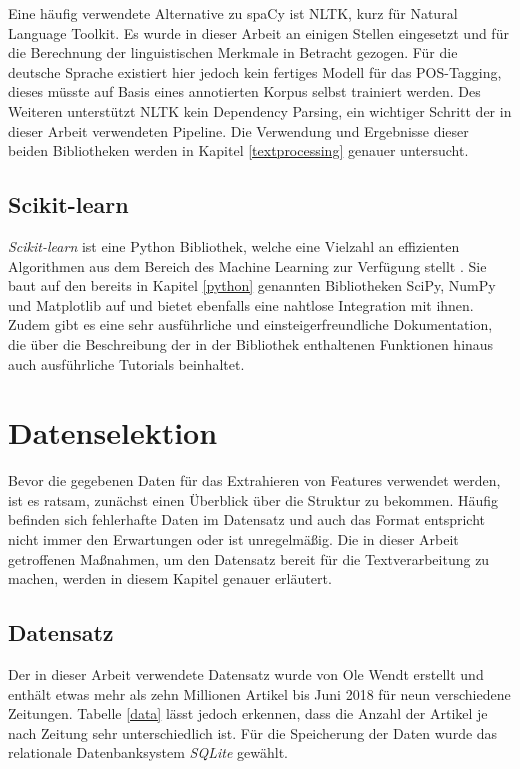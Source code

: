 Eine häufig verwendete Alternative zu spaCy ist NLTK, kurz für Natural Language Toolkit. Es wurde in dieser Arbeit an einigen Stellen eingesetzt und für die Berechnung der linguistischen Merkmale in Betracht gezogen. Für die deutsche Sprache existiert hier jedoch kein fertiges Modell für das POS-Tagging, dieses müsste auf Basis eines annotierten Korpus selbst trainiert werden. Des Weiteren unterstützt NLTK kein Dependency Parsing, ein wichtiger Schritt der in dieser Arbeit verwendeten Pipeline. Die Verwendung und Ergebnisse dieser beiden Bibliotheken werden in Kapitel \ref{textprocessing} genauer untersucht.

\subsection{Scikit-learn}
\emph{Scikit-learn} ist eine Python Bibliothek, welche eine Vielzahl an effizienten Algorithmen aus dem Bereich des Machine Learning zur Verfügung stellt \cite{scikit-learn}. Sie baut auf den bereits in Kapitel \ref{python} genannten Bibliotheken SciPy, NumPy und Matplotlib auf und bietet ebenfalls eine nahtlose Integration mit ihnen. Zudem gibt es eine sehr ausführliche und einsteigerfreundliche Dokumentation, die über die Beschreibung der in der Bibliothek enthaltenen Funktionen hinaus auch ausführliche Tutorials beinhaltet.

\section{Datenselektion}
Bevor die gegebenen Daten für das Extrahieren von Features verwendet werden, ist es ratsam, zunächst einen Überblick über die Struktur zu bekommen. Häufig befinden sich fehlerhafte Daten im Datensatz und auch das Format entspricht nicht immer den Erwartungen oder ist unregelmäßig. Die in dieser Arbeit getroffenen Maßnahmen, um den Datensatz bereit für die Textverarbeitung zu machen, werden in diesem Kapitel genauer erläutert.

\subsection{Datensatz}
Der in dieser Arbeit verwendete Datensatz wurde von Ole Wendt erstellt und enthält etwas mehr als zehn Millionen Artikel bis Juni 2018 für neun verschiedene Zeitungen. Tabelle \ref{data} lässt jedoch erkennen, dass die Anzahl der Artikel je nach Zeitung sehr unterschiedlich ist. Für die Speicherung der Daten wurde das relationale Datenbanksystem \emph{SQLite} gewählt.


